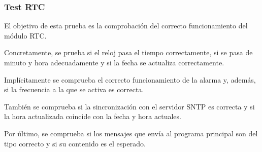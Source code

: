 \subsubsection{Test RTC}

El objetivo de esta prueba es la comprobación del correcto funcionamiento del módulo RTC.

Concretamente, se prueba si el reloj pasa el tiempo correctamente, si se pasa de minuto y hora adecuadamente y si la fecha se actualiza correctamente.

Implícitamente se comprueba el correcto funcionamiento de la alarma y, además, si la frecuencia a la que se activa es correcta.

También se comprueba si la sincronización con el servidor SNTP es correcta y si la hora actualizada coincide con la fecha y hora actuales.

Por último, se comprueba si los mensajes que envía al programa principal son del tipo correcto y si su contenido es el esperado.